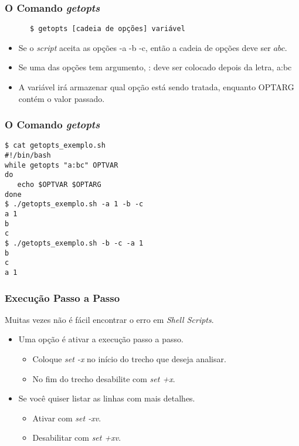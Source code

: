 \documentclass{beamer}
\begin{document}
   \begin{frame}[fragile]
      \frametitle{O Comando \textit{getopts}}
      \begin{verbatim}
      $ getopts [cadeia de opções] variável 
      \end{verbatim}
      \begin{itemize}
         \item Se o \textit{script} aceita as opções -a -b -c, então a cadeia de opções deve ser $abc$. 
         \item Se uma das opções tem argumento, : deve ser colocado depois da letra, a:bc 
         \item A variável irá armazenar qual opção está sendo tratada, enquanto OPTARG contém o valor passado.
      \end{itemize}	 
\end{frame}
   
   \begin{frame}[fragile]
      \frametitle{O Comando \textit{getopts}}
     \begin{verbatim}
$ cat getopts_exemplo.sh 
#!/bin/bash
while getopts "a:bc" OPTVAR
do
   echo $OPTVAR $OPTARG
done
$ ./getopts_exemplo.sh -a 1 -b -c
a 1
b
c
$ ./getopts_exemplo.sh -b -c -a 1  
b
c
a 1
      \end{verbatim}
\end{frame}

   \begin{frame}
      \frametitle{Execução Passo a Passo}
      Muitas vezes não é fácil encontrar o erro em \textit{Shell Scripts}.
      \begin{itemize}
         \item Uma opção é ativar a execução passo a passo.
	      \begin{itemize}
	         \item Coloque \textit{set -x} no início do trecho que deseja analisar.
	         \item No fim do trecho desabilite com \textit{set +x}. 
	      \end{itemize}
	      \item Se você quiser listar as linhas com mais detalhes.
	      \begin{itemize}
	         \item Ativar com \textit{set -xv}.
	         \item Desabilitar com \textit{set +xv}.
	      \end{itemize}
      \end{itemize}
   \end{frame}
\end{document}
